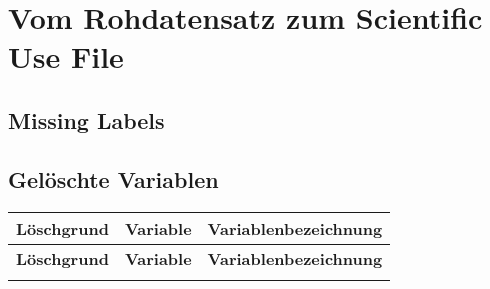 \section{Vom Rohdatensatz zum Scientific Use File}

\subsection{Missing Labels}

\subsection{Gelöschte Variablen}



\begin{longtable}{!{\color{black}\vline width 1pt} L{2.5cm} !{\color{black}\vline width 1pt} L{2.5cm} | L{11.75cm} !{\color{black}\vline width 1pt}  }
	
	\toprule
	\textbf{Löschgrund} & \textbf{Variable} & \textbf{Variablenbezeichnung}  \\ 
	\midrule
	\endfirsthead
	\toprule
		\textbf{Löschgrund} & \textbf{Variable} & \textbf{Variablenbezeichnung}  \\ 
	\midrule
	\endhead
	
	\midrule
	
	\endfoot
	\bottomrule
	\endlastfoot
		
	
	
\end{longtable}